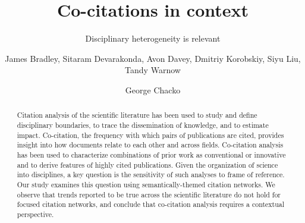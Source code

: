 \documentclass[NETN]{stjour}
\begin{document}
\title[Co-citations in context]{Co-citations in context}
\subtitle{Disciplinary heterogeneity is relevant}



\author[Author Names]
{James Bradley,
Sitaram Devarakonda, Avon Davey, Dmitriy Korobskiy, Siyu Liu, Tandy Warnow
\and George Chacko}










\begin{abstract}
Citation analysis of the scientific literature has been used to study and define disciplinary boundaries, to trace the dissemination of knowledge, and to estimate impact. Co-citation, the frequency with which pairs of publications are cited, provides insight into how documents relate to each other and across fields. Co-citation analysis has been used to characterize combinations of prior work as conventional or innovative and to derive features of highly cited publications. Given the organization of science into disciplines, a key question is the sensitivity of such analyses to frame of reference. Our study examines this question using  semantically-themed citation networks. We observe that trends reported to be true across the scientific literature do not hold for focused citation networks, and conclude that co-citation analysis requires a contextual perspective.
\end{abstract}
\end{document}
